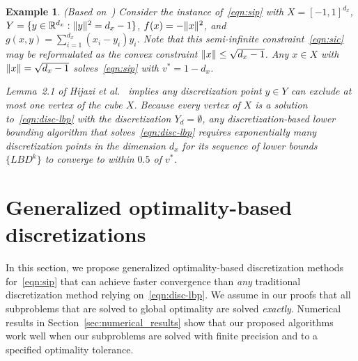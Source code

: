 \documentclass{article}
\DeclarePairedDelimiter\norm{\lVert}{\rVert}%
\newcommand{\R}{\mathbb{R}}
\newcommand{\1}[1]{\mathds{1}\left[#1\right]}
\newtheorem{example}{Example}
\begin{document}
\begin{example}{(Based on~\citep[Ex.\ 1]{hijazi2014outer})}
\label{exm:hijazi}
Consider the instance of~\eqref{eqn:sip} with $X = [-1,1]^{d_x}$, $Y = \{y \in \R^{d_x} : \norm{y}^2 = d_x-1\}$, $f(x) = -\norm{x}^2$, and $g(x,y) = \sum_{i=1}^{d_x} (x_i - y_i)y_i$.
Note that this semi-infinite constraint~\eqref{eqn:sic} may be reformulated as the convex constraint $\norm{x} \leq \sqrt{d_x-1}$.
Any $x \in X$ with $\norm{x} = \sqrt{d_x - 1}$ solves~\eqref{eqn:sip} with $v^* = 1 - d_x$.

Lemma~2.1 of Hijazi et al.\ \cite{hijazi2014outer} implies any discretization point $y \in Y$ can exclude at most one vertex of the cube $X$.
Because every vertex of $X$ is a solution to~\eqref{eqn:disc-lbp} with the discretization $Y_d = \emptyset$, \textit{any} discretization-based lower bounding algorithm that solves~\eqref{eqn:disc-lbp} requires exponentially many discretization points in the dimension $d_x$ for its sequence of lower bounds $\{LBD^k\}$ to converge to within $0.5$ of $v^*$.
\end{example}





\section{Generalized optimality-based discretizations}
\label{sec:generalized_discretization}


In this section, we propose generalized optimality-based discretization methods for~\eqref{eqn:sip} that can achieve faster convergence than \textit{any} traditional discretization method relying on~\eqref{eqn:disc-lbp}.
We assume in our proofs that all subproblems that are solved to global optimality are solved \textit{exactly}. 
Numerical results in Section~\ref{sec:numerical_results} show that our proposed algorithms work well when our subproblems are solved with finite precision and to a specified optimality tolerance. 
\end{document}
